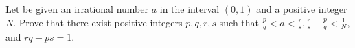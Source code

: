 Let be given an irrational number $a$ in the interval $(0,1)$ and a positive integer $N$.
Prove that there exist positive integers $p,q,r,s$ such that $\frac{p}{q} < a <\frac{r}{s}, \frac{r}{s} -\frac{p}{q}<\frac{1}{N}$, and $rq- ps = 1$.